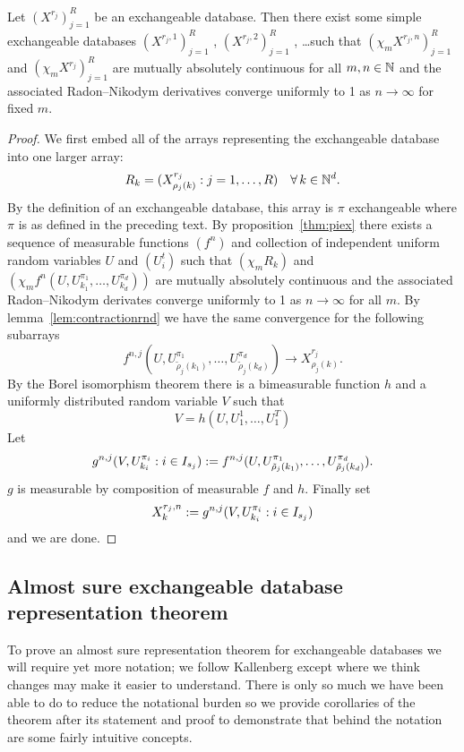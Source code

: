 \begin{thm}
  \label{thm:simple-database}
  Let $(X^{r_j})_{j=1}^R$ be an exchangeable database.
  Then there exist some simple exchangeable databases $(X^{r_j,1})_{j=1}^R$ , $(X^{r_j,2})_{j=1}^R$ , \dots such that
  $(\chi_m X^{r_j,n})_{j=1}^R$ and $(\chi_m X^{r_j})_{j=1}^R$ are mutually absolutely continuous for all $m,n \in \mathbb{N}$ and the associated Radon--Nikodym derivatives converge uniformly to 1 as $n \to \infty$ for fixed $m$.
\end{thm}

\begin{proof}
  We first embed all of the arrays representing the exchangeable database into one larger array:
  \[
    R_{k} = (X^{r_j}_{\rho_j(k)} : j = 1,\dots,R) \quad \forall \, k \in \mathbb{N}^d.
  \]
  By the definition of an exchangeable database, this array is $\pi$ exchangeable where $\pi$ is as defined in the preceding text.
  By proposition~\ref{thm:piex} there exists a sequence of measurable functions $(f^n)$ and collection of independent uniform random variables $U$ and $(U^t_i)$ such that $(\chi_m R_{k})$ and $(\chi_m f^n(U, U^{\pi_1}_{k_1}, \dots, U^{\pi_d}_{k_d}))$ are mutually absolutely continuous and the associated Radon--Nikodym derivates converge uniformly to 1 as $n \to \infty$ for all $m$.
  By lemma~\ref{lem:contractionrnd} we have the same convergence for the following subarrays
  \[
    f^{n,j}(U, U^{\pi_1}_{\tilde{\rho}_j(k_1)}, \dots, U^{\pi_d}_{\tilde{\rho}_j(k_d)}) \to X^{r_j}_{\rho_j(k)}.
  \]
  By the Borel isomorphism theorem there is a bimeasurable function $h$ and a uniformly distributed random variable $V$ such that
  \[
    V = h(U, U^1_1, \dots, U^T_1)
  \]
  Let
  \[
    g^{n,j}(V, U^{\pi_i}_{k_i} : i \in I_{s_j}) := f^{n,j}(U, U^{\pi_1}_{\tilde{\rho}_j(k_1)}, \dots, U^{\pi_d}_{\tilde{\rho}_j(k_d)}).
  \]
  $g$ is measurable by composition of measurable $f$ and $h$.
  Finally set
  \[
    X^{r_j,n}_{k} := g^{n,j}(V, U^{\pi_i}_{k_i} : i \in I_{s_j})
  \]
  and we are done.
\end{proof}

\subsection{Almost sure exchangeable database representation theorem}

To prove an almost sure representation theorem for exchangeable databases we will require yet more notation; we follow Kallenberg except where we think changes may make it easier to understand.
There is only so much we have been able to do to reduce the notational burden so we provide corollaries of the theorem after its statement and proof to demonstrate that behind the notation are some fairly intuitive concepts.

